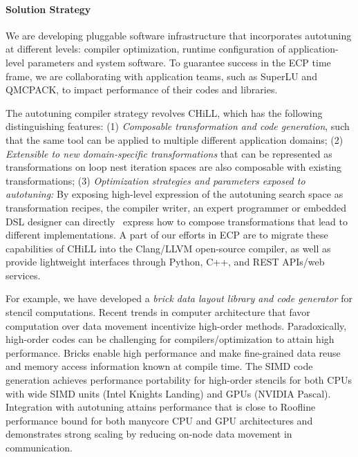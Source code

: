 \paragraph{Solution Strategy}
We are developing pluggable software infrastructure that incorporates
autotuning at different levels: compiler optimization, runtime configuration of application-level parameters and system software.
To guarantee success in the ECP time frame, we are collaborating with
application teams, such as SuperLU and QMCPACK, to impact performance of their
codes and libraries.

The autotuning compiler strategy revolves CHiLL, which has the following distinguishing features:
(1) \textit{Composable transformation and code generation}, such
that the same tool can be applied
to multiple different application domains;
(2) \textit{Extensible to new domain-specific transformations} that can be represented as transformations on loop nest iteration spaces are also
composable with existing transformations;
(3) \textit{Optimization strategies and parameters exposed to autotuning:}
By exposing high-level expression
of the autotuning search space as transformation recipes, the compiler writer, an expert programmer or embedded DSL designer can directly \
express how to compose
 transformations that lead to different implementations.
A part of our efforts in ECP are to migrate these capabilities of CHiLL
into the Clang/LLVM open-source compiler, as well as provide lightweight
interfaces through Python, C++, and REST APIs/web services.

For example, we have developed a \textit{brick data layout library and code generator} for
stencil computations.
Recent trends in computer architecture that favor computation over data movement incentivize high-order methods.  Paradoxically, high-order codes can be challenging for compilers/optimization to attain high performance.  Bricks enable high performance and make fine-grained data reuse and memory access information known at compile time.  The SIMD code generation achieves performance portability
for high-order stencils for both CPUs with wide SIMD units (Intel Knights
Landing) and GPUs (NVIDIA Pascal).  Integration with autotuning attains
performance that is close to Roofline performance bound for both manycore CPU
and GPU architectures and demonstrates strong scaling by reducing on-node data movement in communication.

